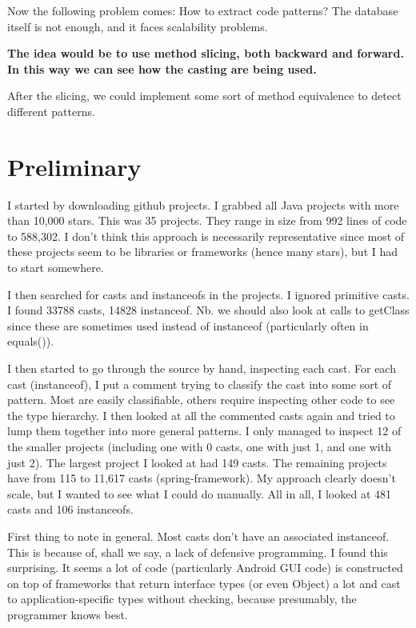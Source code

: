 Now the following problem comes: How to extract code patterns? 
The database itself is not enough, and it faces scalability problems. 

\textbf{\textbf{The idea would be to use method slicing, both backward and forward. 
In this way we can see how the casting are being used.}} 

After the slicing, we could implement some sort of method equivalence to detect 
different patterns. 
\section{Preliminary}
\label{sec:org641dec0}

I started by downloading github projects. 
I grabbed all Java projects with more than 10,000 stars. 
This was 35 projects. 
They range in size from 992 lines of code to 588,302. 
I don't think this approach is necessarily representative since most of these projects seem to be libraries or frameworks (hence many stars), but I had to start somewhere. 

I then searched for casts and instanceofs in the projects. 
I ignored primitive casts. 
I found 33788 casts, 14828 instanceof. 
Nb. we should also look at calls to getClass since these are sometimes used instead of instanceof (particularly often in equals()). 

I then started to go through the source by hand, inspecting each cast. 
For each cast (instanceof), I put a comment trying to classify the cast into some sort of pattern. 
Most are easily classifiable, others require inspecting other code to see the type hierarchy. 
I then looked at all the commented casts again and tried to lump them together into more general patterns. 
I only managed to inspect 12 of the smaller projects (including one with 0 casts, one with just 1, and one with just 2). 
The largest project I looked at had 149 casts. 
The remaining projects have from 115 to 11,617 casts (spring-framework). 
My approach clearly doesn't scale, but I wanted to see what I could do manually. 
All in all, I looked at 481 casts and 106 instanceofs. 

First thing to note in general. 
Most casts don't have an associated instanceof. 
This is because of, shall we say, a lack of defensive programming. 
I found this surprising. 
It seems a lot of code (particularly Android GUI code) is constructed on top of frameworks that return interface types (or even Object) a lot and cast to application-specific types without checking, because presumably, the programmer knows best. 


